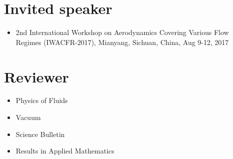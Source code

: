 \documentclass[11pt,a4paper,english]{moderncv}
\begin{document}
\section{Invited speaker}
\begin{itemize}
    \item 2nd International Workshop on Aerodynamics Covering Various Flow Regimes (IWACFR-2017),
        Mianyang, Sichuan, China, Aug 9-12, 2017
\end{itemize}

\section{Reviewer}
\begin{itemize}
    \item Physics of Fluids
    \item Vacuum
    \item Science Bulletin
    \item Results in Applied Mathematics
\end{itemize}

\nocite{*}
\printbibliography[title=Main Publications, keyword=primary, resetnumbers=true]
\printbibliography[title=Other Publications, keyword=secondary, resetnumbers=true]
\end{document}
